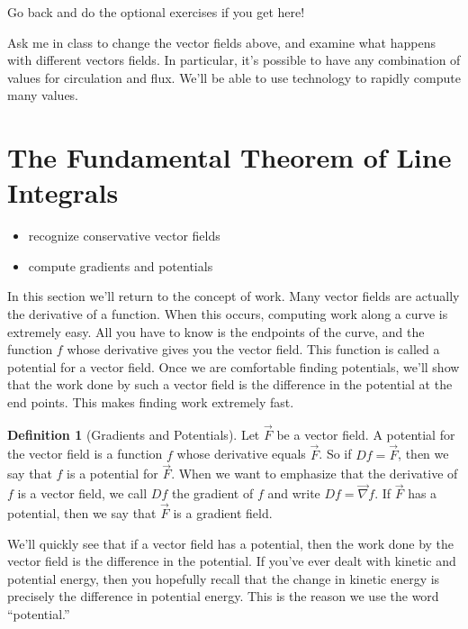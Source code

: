\documentclass[10pt,]{book}
\theoremstyle{plain}
\theoremstyle{definition}
\newtheorem{definition}[theorem]{Definition}
\theoremstyle{definition}
\theoremstyle{definition}
\theoremstyle{definition}
\theoremstyle{definition}
\numberwithin{equation}{section}
\begin{document}
Go back and do the optional exercises if you get here!%
\par
Ask me in class to change the vector fields above, and examine what happens with different vectors fields. In particular, it's possible to have any combination of values for circulation and flux. We'll be able to use technology to rapidly compute many values.%
\typeout{************************************************}
\typeout{************************************************}
\section[{The Fundamental Theorem of Line Integrals}]{The Fundamental Theorem of Line Integrals}\label{section-31}
\leavevmode%
\begin{itemize}[label=\textbullet]
\item{}recognize conservative vector fields%
\item{}compute gradients and potentials%
\end{itemize}
In this section we'll return to the concept of work. Many vector fields are actually the derivative of a function. When this occurs, computing work along a curve is extremely easy. All you have to know is the endpoints of the curve, and the function \(f\) whose derivative gives you the vector field. This function is called a potential for a vector field. Once we are comfortable finding potentials, we'll show that the work done by such a vector field is the difference in the potential at the end points. This makes finding work extremely fast.%
\begin{definition}[{Gradients and Potentials}]\label{definition-35}
Let \(\vec F\) be a vector field. A potential for the vector field is a function \(f\) whose derivative equals \(\vec F\). So if \(Df=\vec F\), then we say that \(f\) is a potential for \(\vec F\). When we want to emphasize that the derivative of \(f\) is a vector field, we call \(Df\) the gradient of \(f\) and write \(Df = \vec \nabla f\). If \(\vec F\) has a potential, then we say that \(\vec F\) is a gradient field.%
\end{definition}
We'll quickly see that if a vector field has a potential, then the work done by the vector field is the difference in the potential. If you've ever dealt with kinetic and potential energy, then you hopefully recall that the change in kinetic energy is precisely the difference in potential energy. This is the reason we use the word ``potential.''%
\end{document}
